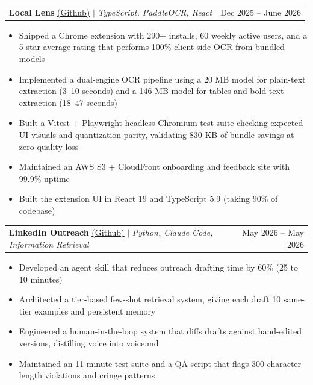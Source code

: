 \documentclass[letterpaper,11pt]{article}
\makeatletter
\newcommand{\resumeItem}[1]{
  \item\small{
    {#1 \vspace{-2pt}}
  }
}
\newcommand{\resumeProjectHeading}[2]{
    \item
    \begin{tabular*}{0.97\textwidth}{l@{\extracolsep{\fill}}r}
      \small#1 & #2 \\
    \end{tabular*}\vspace{-7pt}
}
\newcommand{\resumeItemListStart}{\begin{itemize}}
\newcommand{\resumeItemListEnd}{\end{itemize}\vspace{-5pt}}
\makeatother
\begin{document}
    \resumeProjectHeading
      {\textbf{Local Lens} \href{https://github.com/minhkhoango/local-lens}{\underline{(Github)}} $|$ \emph{TypeScript, PaddleOCR, React}}{Dec 2025 -- June 2026}
      \resumeItemListStart
        \resumeItem{Shipped a Chrome extension with 290+ installs, 60 weekly active users, and a 5-star average rating that performs 100\% client-side OCR from bundled models}
        \resumeItem{Implemented a dual-engine OCR pipeline using a 20 MB model for plain-text extraction (3--10 seconds) and a 146 MB model for tables and bold text extraction (18--47 seconds)}
        \resumeItem{Built a Vitest + Playwright headless Chromium test suite checking expected UI visuals and quantization parity, validating 830 KB of bundle savings at zero quality loss}
        \resumeItem{Maintained an AWS S3 + CloudFront onboarding and feedback site with 99.9\% uptime}
        \resumeItem{Built the extension UI in React 19 and TypeScript 5.9 (taking 90\% of codebase)}
      \resumeItemListEnd

    \resumeProjectHeading
      {\textbf{LinkedIn Outreach} \href{https://github.com/minhkhoango/linkedin-outreach}{\underline{(Github)}} $|$ \emph{Python, Claude Code, Information Retrieval}}{May 2026 -- May 2026}
      \resumeItemListStart
        \resumeItem{Developed an agent skill that reduces outreach drafting time by 60\% (25 to 10 minutes)}
        \resumeItem{Architected a tier-based few-shot retrieval system, giving each draft 10 same-tier examples and persistent memory}
        \resumeItem{Engineered a human-in-the-loop system that diffs drafts against hand-edited versions, distilling voice into voice.md}
        \resumeItem{Maintained an 11-minute test suite and a QA script that flags 300-character length violations and cringe patterns}
      \resumeItemListEnd
\end{document}
